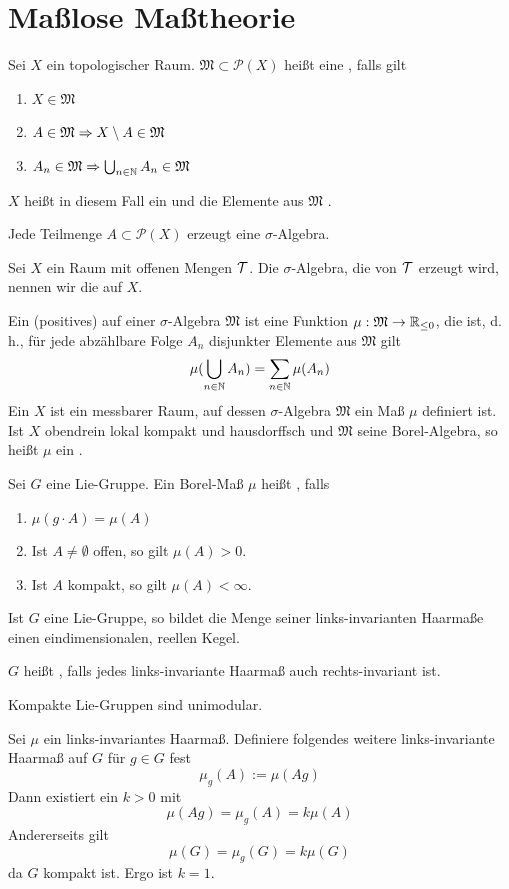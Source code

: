 \documentclass{book}
\renewcommand{\M}{\mathfrak{M}}
\renewcommand{\P}{\mathcal{P}}
\begin{document}
\section{Maßlose Maßtheorie}

\Def{}
Sei $X$ ein topologischer Raum. $\M \subset \P(X)$ heißt eine , falls gilt
\begin{enumerate}
	\item $X \in \M$
	\item $A \in \M \impl{} X\setminus A \in \M$
	\item $A_n \in \M \impl{} \bigcup_{n\in \N}A_n \in \M$
\end{enumerate}
$X$ heißt in diesem Fall ein  und die Elemente aus $\M$ .

\Satz{}
Jede Teilmenge $A \subset \P(X)$ erzeugt eine $\sigma$-Algebra.

\Def{}
Sei $X$ ein Raum mit offenen Mengen $\mathcal{T}$. Die $\sigma$-Algebra, die von $\mathcal{T}$ erzeugt wird, nennen wir die  auf $X$.

\Def{}
Ein (positives)  auf einer $\sigma$-Algebra $\M$ ist eine Funktion $\mu : \M \pfeil{} \R_{\leq 0}$, die  ist, d.\,h., für jede abzählbare Folge $A_n$ disjunkter Elemente aus $\M$ gilt
\[ \mu(\bigcup_{n\in \mathbb{N}}A_n) = \sum_{n\in \mathbb{N}}\mu(A_n) \]
Ein  $X$ ist ein messbarer Raum, auf dessen $\sigma$-Algebra $\M$ ein Maß $\mu$ definiert ist.\\
Ist $X$ obendrein lokal kompakt und hausdorffsch und $\M$ seine Borel-Algebra, so heißt $\mu$ ein .

\Def{}
Sei $G$ eine Lie-Gruppe. Ein Borel-Maß $\mu$ heißt  , falls
\begin{enumerate}
	\item $\mu(g\cdot A) = \mu(A)$
	\item Ist $A\neq\emptyset$ offen, so gilt $\mu(A) > 0$.
	\item Ist $A$ kompakt, so gilt $\mu(A) < \infty$.
\end{enumerate}

\Lem{}
Ist $G$ eine Lie-Gruppe, so bildet die Menge seiner links-invarianten Haarmaße einen eindimensionalen, reellen Kegel.

\Def{}
$G$ heißt , falls jedes links-invariante Haarmaß auch rechts-invariant ist.

\Lem{}
Kompakte Lie-Gruppen sind unimodular.
\begin{Beweis}{}
	Sei $\mu$ ein links-invariantes Haarmaß. Definiere folgendes weitere links-invariante Haarmaß auf $G$ für $g\in G$ fest
	\[ \mu_g(A) := \mu(Ag) \]
	Dann existiert ein $k > 0$ mit
	\[ \mu(Ag) = \mu_g(A) = k \mu(A) \]
	Andererseits gilt
	\[ \mu(G) = \mu_g(G) = k \mu(G) \]
	da $G$ kompakt ist. Ergo ist $k = 1$.
\end{Beweis}
\end{document}
